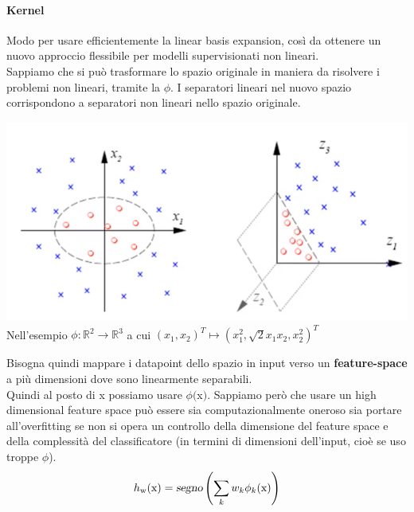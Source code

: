 \documentclass[10pt]{book}
\begin{document}
\paragraph{Kernel} Modo per usare efficientemente la linear basis expansion, così da ottenere un nuovo approccio flessibile per modelli supervisionati non lineari.\\
Sappiamo che si può trasformare lo spazio originale in maniera da risolvere i problemi non lineari, tramite la $\phi$. I separatori lineari nel nuovo spazio corrispondono a separatori non lineari nello spazio originale.
\begin{center}
	\includegraphics[scale=0.6]{mlkernel.png}\\
	Nell'esempio $\phi : \mathbb{R}^2 \rightarrow \mathbb{R}^3$ a cui $(x_1, x_2)^T\mapsto (x_1^2, \sqrt{2}x_1x_2, x_2^2)^T$
\end{center}
Bisogna quindi mappare i datapoint dello spazio in input verso un \textbf{feature-space} a più dimensioni dove sono linearmente separabili.\\
Quindi al posto di x possiamo usare $\phi($x$)$. Sappiamo però che usare un high dimensional feature space può essere sia computazionalmente oneroso sia portare all'overfitting se non si opera un controllo della dimensione del feature space e della complessità del classificatore (in termini di dimensioni dell'input, cioè se uso troppe $\phi$).
$$h_\text{w}(\text{x}) = \textsl{segno}\left(\sum_k w_k\phi_k(\text{x})\right)$$
\end{document}
